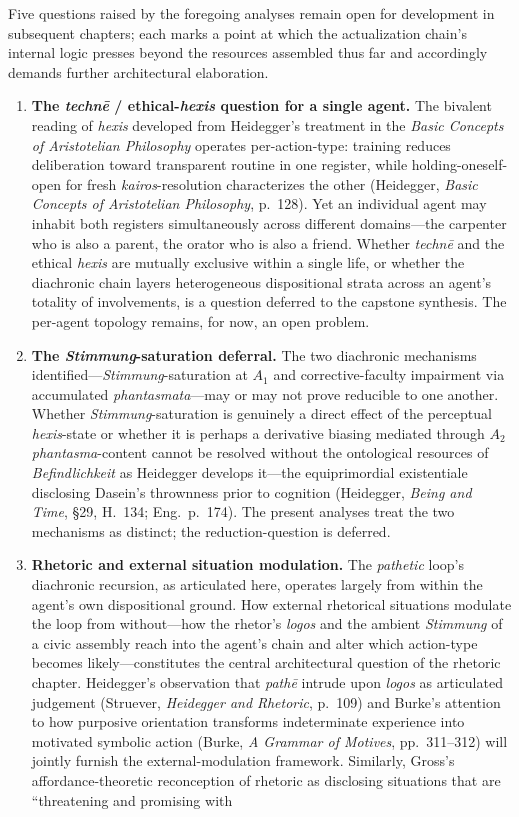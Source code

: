 \documentclass{article}
\begin{document}
Five questions raised by the foregoing analyses remain open for development in subsequent chapters; each marks a point at which the actualization chain's internal logic presses beyond the resources assembled thus far and accordingly demands further architectural elaboration. \begin{enumerate}

\item \textbf{The \textit{technē} / ethical-\textit{hexis} question for a single agent.} The bivalent reading of \textit{hexis} developed from Heidegger's treatment in the \textit{Basic Concepts of Aristotelian Philosophy} operates per-action-type: training reduces deliberation toward transparent routine in one register, while holding-oneself-open for fresh \textit{kairos}-resolution characterizes the other (Heidegger, \textit{Basic Concepts of Aristotelian Philosophy}, p.~128). Yet an individual agent may inhabit both registers simultaneously across different domains---the carpenter who is also a parent, the orator who is also a friend. Whether \textit{technē} and the ethical \textit{hexis} are mutually exclusive within a single life, or whether the diachronic chain layers heterogeneous dispositional strata across an agent's totality of involvements, is a question deferred to the capstone synthesis. The per-agent topology remains, for now, an open problem. \item \textbf{The \textit{Stimmung}-saturation deferral.} The two diachronic mechanisms identified---\textit{Stimmung}-saturation at $A_1$ and corrective-faculty impairment via accumulated \textit{phantasmata}---may or may not prove reducible to one another. Whether \textit{Stimmung}-saturation is genuinely a direct effect of the perceptual \textit{hexis}-state or whether it is perhaps a derivative biasing mediated through $A_2$ \textit{phantasma}-content cannot be resolved without the ontological resources of \textit{Befindlichkeit} as Heidegger develops it---the equiprimordial existentiale disclosing Dasein's thrownness prior to cognition (Heidegger, \textit{Being and Time}, \S29, H.~134; Eng.~p.~174). The present analyses treat the two mechanisms as distinct; the reduction-question is deferred. \item \textbf{Rhetoric and external situation modulation.} The \textit{pathetic} loop's diachronic recursion, as articulated here, operates largely from within the agent's own dispositional ground. How external rhetorical situations modulate the loop from without---how the rhetor's \textit{logos} and the ambient \textit{Stimmung} of a civic assembly reach into the agent's chain and alter which action-type becomes likely---constitutes the central architectural question of the rhetoric chapter. Heidegger's observation that \textit{pathē} intrude upon \textit{logos} as articulated judgement (Struever, \textit{Heidegger and Rhetoric}, p.~109) and Burke's attention to how purposive orientation transforms indeterminate experience into motivated symbolic action (Burke, \textit{A Grammar of Motives}, pp.~311--312) will jointly furnish the external-modulation framework. Similarly, Gross's affordance-theoretic reconception of rhetoric as disclosing situations that are ``threatening and promising with 
\end{enumerate}
\end{document}
